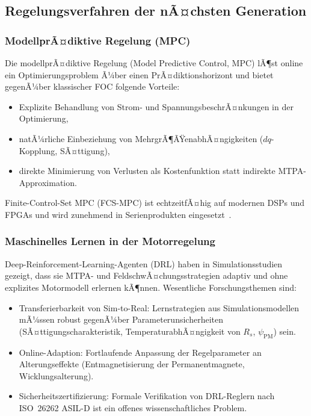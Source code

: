 ﻿\documentclass[a4paper,12pt]{article}
\theoremstyle{definition}
\begin{document}
\subsection{Regelungsverfahren der nÃ¤chsten Generation}

\subsubsection{ModellprÃ¤diktive Regelung (MPC)}

Die modellprÃ¤diktive Regelung (Model Predictive Control, MPC) lÃ¶st online ein
Optimierungsproblem Ã¼ber einen PrÃ¤diktionshorizont und bietet gegenÃ¼ber
klassischer FOC folgende Vorteile:
\begin{itemize}
    \item Explizite Behandlung von Strom- und SpannungsbeschrÃ¤nkungen
          in der Optimierung,
    \item natÃ¼rliche Einbeziehung von MehrgrÃ¶ÃŸenabhÃ¤ngigkeiten
          ($dq$-Kopplung, SÃ¤ttigung),
    \item direkte Minimierung von Verlusten als Kostenfunktion
          statt indirekte MTPA-Approximation.
\end{itemize}
Finite-Control-Set MPC (FCS-MPC) ist echtzeitfÃ¤hig auf modernen DSPs und FPGAs
und wird zunehmend in Serienprodukten eingesetzt~\cite{rodriguez2013mpc}.

\subsubsection{Maschinelles Lernen in der Motorregelung}

Deep-Reinforcement-Learning-Agenten (DRL) haben in Simulationsstudien gezeigt,
dass sie MTPA- und FeldschwÃ¤chungsstrategien adaptiv und ohne explizites
Motormodell erlernen kÃ¶nnen. Wesentliche Forschungsthemen sind:
\begin{itemize}
    \item Transferierbarkeit von Sim-to-Real: Lernstrategien aus Simulationsmodellen
          mÃ¼ssen robust gegenÃ¼ber Parameterunsicherheiten (SÃ¤ttigungscharakteristik,
          TemperaturabhÃ¤ngigkeit von $R_s$, $\psi_{\mathrm{PM}}$) sein.
    \item Online-Adaption: Fortlaufende Anpassung der Regelparameter an
          Alterungseffekte (Entmagnetisierung der Permanentmagnete, Wicklungsalterung).
    \item Sicherheitszertifizierung: Formale Verifikation von DRL-Reglern nach
          ISO~26262 ASIL-D ist ein offenes wissenschaftliches Problem.
\end{itemize}
\end{document}
